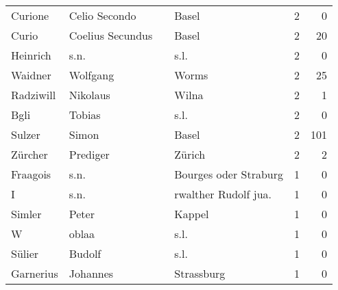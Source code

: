 \begin{tabular}{llllrr}
                  Curione &                      Celio Secondo &             &                                       Basel &          2 &         0 \\
                    Curio &                   Coelius Secundus &             &                                       Basel &          2 &        20 \\
                 Heinrich &                               s.n. &             &                                        s.l. &          2 &         0 \\
                  Waidner &                           Wolfgang &             &                                       Worms &          2 &        25 \\
                Radziwill &                           Nikolaus &             &                                       Wilna &          2 &         1 \\
                     Bgli &                             Tobias &             &                                        s.l. &          2 &         0 \\
                   Sulzer &                              Simon &             &                                       Basel &          2 &       101 \\
                  Zürcher &                           Prediger &             &                                      Zürich &          2 &         2 \\
                 Fraagois &                               s.n. &             &                       Bourges oder Straburg &          1 &         0 \\
                        I &                               s.n. &             &                       rwalther Rudolf jua.  &          1 &         0 \\
                   Simler &                              Peter &             &                                      Kappel &          1 &         0 \\
                        W &                              oblaa &             &                                        s.l. &          1 &         0 \\
                   Sülier &                             Budolf &             &                                        s.l. &          1 &         0 \\
                Garnerius &                           Johannes &             &                                  Strassburg &          1 &         0 \\

\end{tabular}
